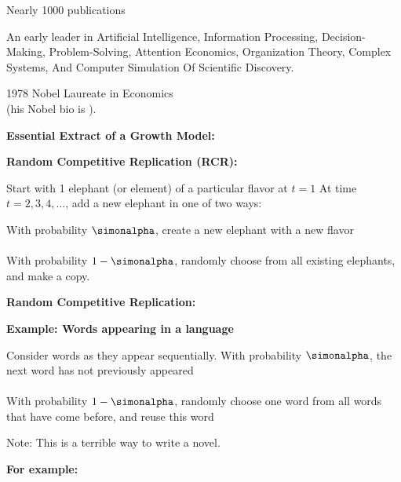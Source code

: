     Nearly 1000 publications
   
    An early leader in
    Artificial Intelligence, Information Processing,
    Decision-Making, Problem-Solving, Attention Economics, Organization
    Theory, Complex Systems, And Computer Simulation Of Scientific
    Discovery. 
   
    1978 Nobel Laureate in Economics\\
    (his Nobel bio is ).
  
  



  \textbf{Essential Extract of a Growth Model:}

  \textbf{Random Competitive Replication (RCR):}
    
     Start with 1 elephant (or element) of a particular flavor at $t=1$
     At time $t=2,3,4,\ldots$, add a new elephant in
      one of two ways:
      
       With probability $\simonalpha$, create a new elephant
        with a new flavor\\
        {}\\
        \bigskip
       With probability $1-\simonalpha$, randomly choose
        from all existing elephants, and make a copy.\\
        {}
        \bigskip
      
    
  


  \textbf{Random Competitive Replication:}
  
  \textbf{Example: Words appearing in a language}
    
     Consider words as they appear sequentially.
     With probability $\simonalpha$, the next word
      has not previously appeared\\
      {}\\
      \bigskip
     With probability $1-\simonalpha$, randomly choose
      one word from all words that have come before, and reuse this word\\
      {}
    
  

  
    Note: This is a terrible way to write a novel.
  


  \textbf{For example:}

